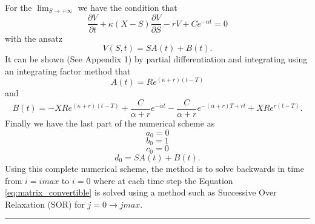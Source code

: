 \documentclass{article}
\begin{document}
For the \({\lim}_{S \to +\infty}\) we have the condition that
\begin{equation}
  \frac{\partial V}{\partial t} +\kappa(X -S)\frac{\partial V}{\partial S} -rV + Ce^{-\alpha t} =0
  \label{eq:large_s_boundary}
\end{equation}
with the ansatz
\begin{equation}
  V(S,t)=SA(t)+B(t).
  \label{eq:ansatz}
\end{equation}
It can be shown (See Appendix 1) by partial differentiation and integrating using an integrating factor method that
\begin{equation}
  A(t)=Re^{(\kappa+r)(t-T)}
  \label{eq:A}
\end{equation}
and\begin{equation}
  B(t)=-XRe^{(\kappa+r)(t-T)}+\frac{C}{\alpha+r}e^{-\alpha t}-\frac{C}{\alpha+r}e^{-(\alpha+r)T+rt}+XRe^{r(t-T)}.
  \label{eq:B}
\end{equation}
Finally we have the last part of the numerical scheme as
\begin{equation}
  a_0 = 0
  \label{eq:amax}
\end{equation}
\begin{equation}
  b_0 = 1
  \label{eq:bmax}
\end{equation}
\begin{equation}
  c_0 =0
  \label{eq:cmax}
\end{equation}
\begin{equation}
  d_0 = SA(t)+B(t).
  \label{eq:dmax}
\end{equation}
Using this complete numerical scheme, the method is to solve backwards in time from $i=imax$ to $i=0$ where at each time step the Equation \ref{eq:matrix_convertible} is solved using
a method such as Successive Over Relaxation (SOR) for $j=0\to jmax$.
\par\noindent\rule{\textwidth}{0.4pt}
\end{document}
